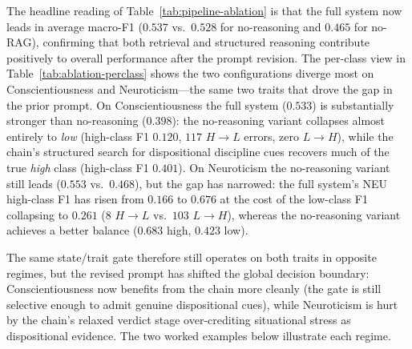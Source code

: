 \documentclass[../main.tex]{subfiles}
\begin{document}
The headline reading of Table~\ref{tab:pipeline-ablation} is that the full system
now leads in average macro-F1 ($0.537$ vs.\ $0.528$ for no-reasoning and $0.465$
for no-RAG), confirming that both retrieval and structured reasoning contribute
positively to overall performance after the prompt revision.
The per-class view in Table~\ref{tab:ablation-perclass} shows the two
configurations diverge most on Conscientiousness and Neuroticism---the same two
traits that drove the gap in the prior prompt. On Conscientiousness the full
system ($0.533$) is substantially stronger than no-reasoning ($0.398$): the
no-reasoning variant collapses almost entirely to \textit{low} (high-class F1
$0.120$, $117$ $H{\to}L$ errors, zero $L{\to}H$), while the chain's structured
search for dispositional discipline cues recovers much of the true \textit{high}
class (high-class F1 $0.401$). On Neuroticism the no-reasoning variant still
leads ($0.553$ vs.\ $0.468$), but the gap has narrowed: the full system's NEU
high-class F1 has risen from $0.166$ to $0.676$ at the cost of the low-class F1
collapsing to $0.261$ ($8$ $H{\to}L$ vs.\ $103$ $L{\to}H$), whereas the
no-reasoning variant achieves a better balance ($0.683$ high, $0.423$ low).

The same state/trait gate therefore still operates on both traits in opposite
regimes, but the revised prompt has shifted the global decision boundary:
Conscientiousness now benefits from the chain more cleanly (the gate is still
selective enough to admit genuine dispositional cues), while Neuroticism is hurt
by the chain's relaxed verdict stage over-crediting situational stress as
dispositional evidence. The two worked examples below illustrate each regime.
\end{document}
